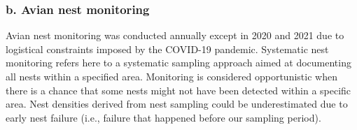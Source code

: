 \documentclass[a4paper,twoside,10pt]{article}
\begin{document}
		\subsubsection*{b. Avian nest monitoring}
Avian nest monitoring was conducted annually except in 2020 and 2021 due to logistical constraints imposed by the COVID-19 pandemic. Systematic nest monitoring refers here to a systematic sampling approach aimed at documenting all nests within a specified area. Monitoring is considered opportunistic when there is a chance that some nests might not have been detected within a specific area. Nest densities derived from nest sampling could be underestimated due to early nest failure (i.e., failure that happened before our sampling period).


\end{document}
